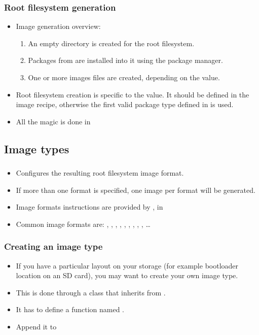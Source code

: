 \begin{frame}
  \frametitle{Root filesystem generation}
  \begin{itemize}
    \item Image generation overview:
      \begin{enumerate}
        \item An empty directory is created for the root filesystem.
        \item Packages from  are installed into it
          using the package manager.
        \item One or more images files are created, depending on the
           value.
      \end{enumerate}
    \item Root filesystem creation is specific to the 
      value. It should be defined in the image recipe, otherwise the
      first valid package type defined in  is
      used.
    \item All the magic is done in
  \end{itemize}
\end{frame}

\subsection{Image types}

\begin{frame}
  \frametitle{}
  \begin{itemize}
    \item Configures the resulting root filesystem image format.
    \item If more than one format is specified, one image per format
      will be generated.
    \item Image formats instructions are provided by
      , in
    \item Common image formats are: , , ,
          , , , ,
          , , \dots
  \end{itemize}
\end{frame}

\begin{frame}
  \frametitle{Creating an image type}
  \begin{itemize}
    \item If you have a particular layout on your storage (for example
      bootloader location on an SD card), you may want to create your
      own image type.
    \item This is done through a class that inherits from
      .
    \item It has to define a function named .
    \item Append it to 
  \end{itemize}
\end{frame}

